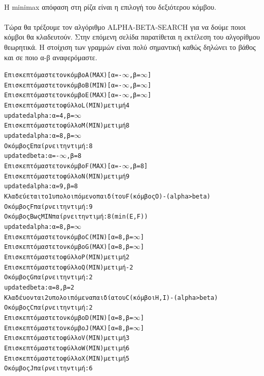 \documentclass{article}
\begin{document}
\\
Η \textlatin{minimax} απόφαση στη ρίζα είναι η επιλογή του δεξιότερου κόμβου.
\\\\
Τώρα θα τρέξουμε τον αλγόριθμο \textlatin{ALPHA-BETA-SEARCH} για να δούμε ποιοι κόμβοι θα κλαδευτούν. Στην επόμενη σελίδα παρατίθεται η εκτέλεση του αλγορίθμου θεωρητικά. Η στοίχιση των γραμμών είναι πολύ σημαντική καθώς δηλώνει το βάθος και σε ποιο α-β αναφερόμαστε.
\pagebreak
\begin{alltt}
Επισκεπτόμαστε τον κόμβο \textlatin{A} (\textlatin{MAX}) [α=-\(\infty\), β=\(\infty\)]
  Επισκεπτόμαστε τον κόμβο \textlatin{B} (\textlatin{MIN}) [α=-\(\infty\), β=\(\infty\)]
    Επισκεπτόμαστε τον κόμβο \textlatin{E} (\textlatin{MAX}) [α=-\(\infty\), β=\(\infty\)]
      Επισκεπτόμαστε το φύλλο \textlatin{L} (\textlatin{MIN}) με τιμή 4
    \textlatin{updated alpha}: α=4, β=\(\infty\)
      Επισκεπτόμαστε το φύλλο \textlatin{M} (\textlatin{MIN}) με τιμή 8
    \textlatin{updated alpha}: α=8, β=\(\infty\)
    Ο κόμβος \textlatin{E} παίρνει την τιμή: 8
  \textlatin{updated beta}: α=-\(\infty\), β=8
    Επισκεπτόμαστε τον κόμβο \textlatin{F} (\textlatin{MAX}) [α=-\(\infty\), β=8]
      Επισκεπτόμαστε το φύλλο \textlatin{N} (\textlatin{MIN}) με τιμή 9
    \textlatin{updated alpha}: α=9, β=8
    Κλαδεύεται το 1 υπολοιπόμενο παιδί του \textlatin{F} (κόμβος Ο) - (\textlatin{alpha>beta})
    Ο κόμβος \textlatin{F} παίρνει την τιμή: 9
  Ο κόμβος \textlatin{B} ως \textlatin{MIN} παίρνει την τιμή: 8 ( min(\textlatin{E}, \textlatin{F}) )
\textlatin{updated alpha}: α=8, β=\(\infty\)
  Επισκεπτόμαστε τον κόμβο \textlatin{C} (\textlatin{MIN}) [α=8, β=\(\infty\)]
    Επισκεπτόμαστε τον κόμβο \textlatin{G} (\textlatin{MAX}) [α=8, β=\(\infty\)]
      Επισκεπτόμαστε το φύλλο \textlatin{P} (\textlatin{MIN}) με τιμή 2
      Επισκεπτόμαστε το φύλλο \textlatin{Q} (\textlatin{MIN}) με τιμή -2
    Ο κόμβος \textlatin{G} παίρνει την τιμή: 2
  \textlatin{updated beta}: α=8, β=2
  Κλαδέυονται 2 υπολοιπόμενα παιδία του \textlatin{C} (κόμβοι \textlatin{H}, \textlatin{I}) - (\textlatin{alpha>beta})
  Ο κόμβος \textlatin{C} παίρνει την τιμή: 2
  Επισκεπτόμαστε τον κόμβο \textlatin{D} (\textlatin{MIN}) [α=8, β=\(\infty\)]
    Επισκεπτόμαστε τον κόμβο \textlatin{J} (\textlatin{MAX}) [α=8, β=\(\infty\)]
      Επισκεπτόμαστε το φύλλο \textlatin{V} (\textlatin{MIN}) με τιμή 3
      Επισκεπτόμαστε το φύλλο \textlatin{W} (\textlatin{MIN}) με τιμή 6
      Επισκεπτόμαστε το φύλλο \textlatin{X} (\textlatin{MIN}) με τιμή 5
    Ο κόμβος \textlatin{J} παίρνει την τιμή: 6

\end{alltt}
\end{document}
